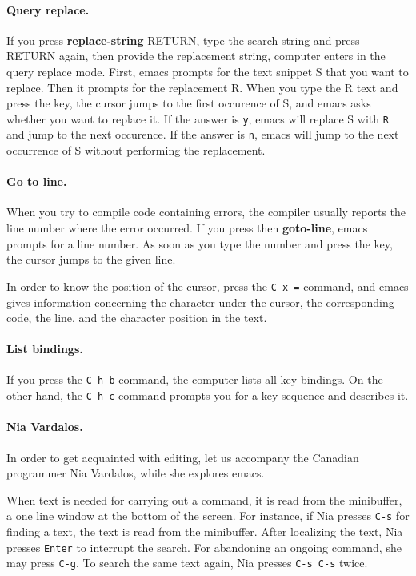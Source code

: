 \documentclass[a4paper,12pt]{book}
\begin{document}
\paragraph{Query replace.} If you press
 {\bf replace-string}
RETURN, type the search string and
press RETURN again, then provide the
replacement string, computer enters
in the query replace mode. First, emacs
prompts for the text snippet S
that you want to replace. Then it prompts for
the replacement R. When you type the R text and
press the  key, the cursor jumps to
the first occurence of S, and emacs
asks whether you want to
replace it. If the answer is
\verb|y|, emacs will replace S
with \verb|R| and jump to the next occurence.
If the answer is \verb|n|, emacs will
jump to the next occurrence of S without
performing the replacement.

\paragraph{Go to line.} When you try to compile
code containing errors, the compiler
usually reports the line number where the error occurred.
If you press  then {\bf goto-line},
emacs prompts for a line number. As soon as you
type the number and press the 
key, the cursor jumps to the given line.

In order to know the position of the cursor,
press the \verb|C-x =| command,
and emacs gives information concerning
the character under the
cursor, the corresponding code, the line,
and the character position in the text.

\paragraph{List bindings.} If you press
the \verb|C-h b| command,
the computer lists all key bindings.
On the other hand, the \verb|C-h c| command
prompts you for a key sequence
and describes it.


\paragraph{Nia Vardalos.}
In order to get acquainted with editing,
let us accompany the Canadian programmer Nia
Vardalos, while she explores emacs.

When text is needed for carrying out a command,
it is read from the minibuffer, a one line
window at the bottom of the screen. For instance, 
if Nia presses \verb|C-s| for finding a text, 
the text is read from the minibuffer. After
localizing the text, Nia presses \verb|Enter|
to interrupt the search. For abandoning an ongoing
command, she may press \verb|C-g|. To search the
same text again, Nia presses \verb|C-s C-s|
twice.
\end{document}
